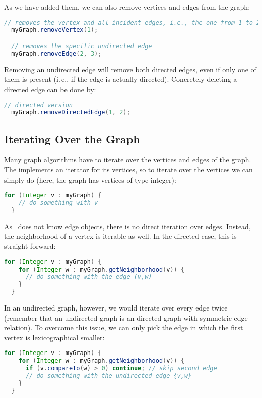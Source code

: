 \documentclass[a4paper, ukenglish, twoside, openright]{jdrasilmanual}
\begin{document}
As we have added them, we can also remove vertices and edges from the
graph:
\begin{lstlisting}[language=Java]
  // removes the vertex and all incident edges, i.e., the one from 1 to 2
  myGraph.removeVertex(1);

  // removes the specific undirected edge
  myGraph.removeEdge(2, 3);
\end{lstlisting}
Removing an undirected edge will remove both directed edges, even if
only one of them is present (i.\,e., if the edge is actually
directed). Concretely deleting a directed edge can be done by:
\begin{lstlisting}[language=Java]
  // directed version
  myGraph.removeDirectedEdge(1, 2);
\end{lstlisting}
\subsection{Iterating Over the Graph}
Many graph algorithms have to iterate over the vertices and edges of
the graph. The  implements an iterator for its vertices,
so to iterate over the vertices we can simply do (here, the graph has
vertices of type integer):
\begin{lstlisting}[language=Java]
  for (Integer v : myGraph) {
    // do something with v
  }
\end{lstlisting}
As \Jdrasil\ does not know edge objects, there is no direct iteration
over edges. Instead, the neighborhood of a vertex is iterable as well.
In the directed case, this is straight forward:
\begin{lstlisting}[language=Java]
  for (Integer v : myGraph) {
    for (Integer w : myGraph.getNeighborhood(v)) {
      // do something with the edge (v,w)
    }
  }
\end{lstlisting}
In an undirected graph, however, we would iterate over every edge
twice (remember that an undirected graph is an directed graph with
symmetric edge relation). To overcome this issue, we can only pick the edge
in which the first vertex is lexicographical smaller:
\begin{lstlisting}[language=Java]
  for (Integer v : myGraph) {
    for (Integer w : myGraph.getNeighborhood(v)) {
      if (v.compareTo(w) > 0) continue; // skip second edge
      // do something with the undirected edge {v,w}
    }
  }
\end{lstlisting}
\end{document}
